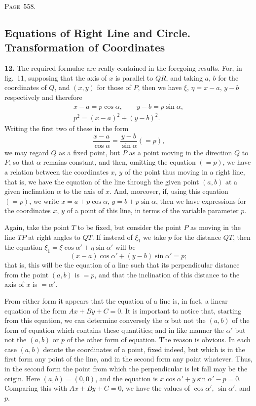 \documentclass[11pt,a4paper]{article}
\theoremstyle{definition}
\begin{document}
\newpage
\noindent\textsc{Page~558.} \subsection*{Equations of Right Line and Circle. Transformation of Coordinates}

\textbf{12.} The required formulae are really contained in the foregoing results. For, in fig.~11, supposing that the axis of $x$ is parallel to $QR$, and taking $a$, $b$ for the coordinates of $Q$, and $(x,y)$ for those of $P$, then we have $\xi$, $\eta = x-a$, $y-b$ respectively and therefore
\begin{gather*}
x-a = p\cos\alpha,\qquad y-b = p\sin\alpha,\\
p^2 = (x-a)^2+(y-b)^2.
\end{gather*}
Writing the first two of these in the form
\[
\frac{x-a}{\cos\alpha} = \frac{y-b}{\sin\alpha} (= p),
\]
we may regard $Q$ as a fixed point, but $P$ as a point moving in the direction $Q$ to $P$, so that $\alpha$ remains constant, and then, omitting the equation $(=p)$, we have a relation between the coordinates $x$, $y$ of the point thus moving in a right line, that is, we have the equation of the line through the given point $(a,b)$ at a given inclination $\alpha$ to the axis of $x$. And, moreover, if, using this equation $(=p)$, we write $x=a+p\cos\alpha$, $y=b+p\sin\alpha$, then we have expressions for the coordinates $x$, $y$ of a point of this line, in terms of the variable parameter $p$.

Again, take the point $T$ to be fixed, but consider the point $P$ as moving in the line $TP$ at right angles to $QT$. If instead of $\xi_1$ we take $p$ for the distance $QT$, then the equation $\xi_1=\xi\cos\alpha'+\eta\sin\alpha'$ will be
\[
(x-a)\cos\alpha' + (y-b)\sin\alpha' = p;
\]
that is, this will be the equation of a line such that its perpendicular distance from the point $(a,b)$ is $=p$, and that the inclination of this distance to the axis of $x$ is $=\alpha'$.

From either form it appears that the equation of a line is, in fact, a linear equation of the form $Ax+By+C=0$. It is important to notice that, starting from this equation, we can determine conversely the $\alpha$ but not the $(a,b)$ of the form of equation which contains these quantities; and in like manner the $\alpha'$ but not the $(a,b)$ or $p$ of the other form of equation. The reason is obvious. In each case $(a,b)$ denote the coordinates of a point, fixed indeed, but which is in the first form any point of the line, and in the second form any point whatever. Thus, in the second form the point from which the perpendicular is let fall may be the origin. Here $(a,b)=(0,0)$, and the equation is $x\cos\alpha'+y\sin\alpha'-p=0$. Comparing this with $Ax+By+C=0$, we have the values of $\cos\alpha'$, $\sin\alpha'$, and $p$.
\end{document}
